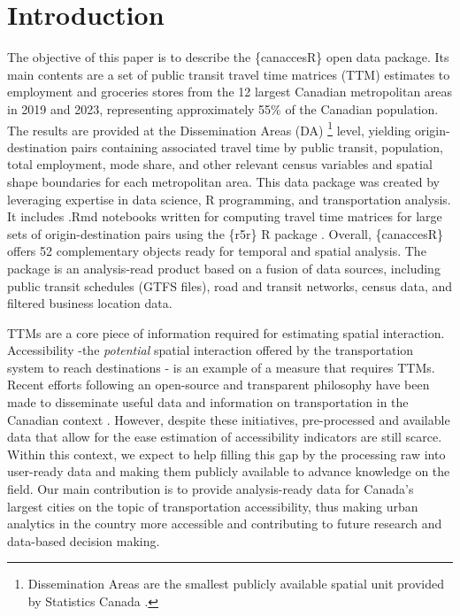 \documentclass[Royal,times,sageh]{sagej}
\begin{document}
\maketitle

\section{Introduction}\label{introduction}

The objective of this paper is to describe the \{canaccesR\} open data
package. Its main contents are a set of public transit travel time
matrices (TTM) estimates to employment and groceries stores from the 12
largest Canadian metropolitan areas in 2019 and 2023, representing
approximately 55\% of the Canadian population. The results are provided
at the Dissemination Areas (DA) \footnote{Dissemination Areas are the
  smallest publicly available spatial unit provided by Statistics Canada
  \citep{governmentofcanadaDictionaryCensusPopulation2021a}.} level,
yielding origin-destination pairs containing associated travel time by
public transit, population, total employment, mode share, and other
relevant census variables and spatial shape boundaries for each
metropolitan area. This data package was created by leveraging expertise
in data science, R programming, and transportation analysis. It includes
.Rmd notebooks written for computing travel time matrices for large sets
of origin-destination pairs using the \{r5r\} R package
\citep{pereiraR5rRapidRealistic2021}. Overall, \{canaccesR\} offers 52
complementary objects ready for temporal and spatial analysis. The
package is an analysis-read product based on a fusion of data sources,
including public transit schedules (GTFS files), road and transit
networks, census data, and filtered business location data.

TTMs are a core piece of information required for estimating spatial
interaction. Accessibility -the \emph{potential} spatial interaction
offered by the transportation system to reach destinations
\citep{paezMeasuringAccessibilityPositive2012}- is an example of a
measure that requires TTMs. Recent efforts following an open-source and
transparent philosophy have been made to disseminate useful data and
information on transportation in the Canadian context
\citep{soukhovTTS2016RDataSet2023}. However, despite these initiatives,
pre-processed and available data that allow for the ease estimation of
accessibility indicators are still scarce. Within this context, we
expect to help filling this gap by the processing raw into user-ready
data and making them publicly available to advance knowledge on the
field. Our main contribution is to provide analysis-ready data for
Canada's largest cities on the topic of transportation accessibility,
thus making urban analytics in the country more accessible and
contributing to future research and data-based decision making.
\end{document}
